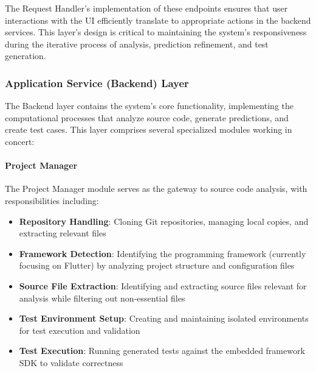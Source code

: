 \hspace{0.5cm}The Request Handler's implementation of these endpoints ensures that user interactions with the UI efficiently translate to appropriate actions in the backend services. This layer's design is critical to maintaining the system's responsiveness during the iterative process of analysis, prediction refinement, and test generation.

\subsubsection{Application Service (Backend) Layer}

\hspace{0.5cm}The Backend layer contains the system's core functionality, implementing the computational processes that analyze source code, generate predictions, and create test cases. This layer comprises several specialized modules working in concert:

\paragraph{Project Manager}
\hspace{0.5cm}The Project Manager module serves as the gateway to source code analysis, with responsibilities including:

\begin{itemize}
    \item \textbf{Repository Handling}: Cloning Git repositories, managing local copies, and extracting relevant files
    
    \item \textbf{Framework Detection}: Identifying the programming framework (currently focusing on Flutter) by analyzing project structure and configuration files
    
    \item \textbf{Source File Extraction}: Identifying and extracting source files relevant for analysis while filtering out non-essential files
    
    \item \textbf{Test Environment Setup}: Creating and maintaining isolated environments for test execution and validation
    
    \item \textbf{Test Execution}: Running generated tests against the embedded framework SDK to validate correctness
\end{itemize}

